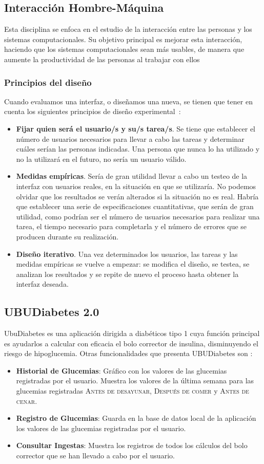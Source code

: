 \subsection{Interacción Hombre-Máquina}
Esta disciplina se enfoca en el estudio de la interacción entre las personas y los sistemas computacionales. Su objetivo principal es mejorar esta interacción, haciendo que los sistemas computacionales sean más usables, de manera que aumente la productividad de las personas al trabajar con ellos
\subsubsection{Principios del diseño}
Cuando evaluamos una interfaz, o diseñamos una nueva, se tienen que tener en cuenta los siguientes principios de diseño experimental~\cite{wiki:ipc}:
\begin{itemize}
	\item \textbf{Fijar quien será el usuario/s y su/s tarea/s}. Se tiene que establecer el número de usuarios necesarios para llevar a cabo las tareas y determinar cuáles serían las personas indicadas. Una persona que nunca lo ha utilizado y no la utilizará en el futuro, no sería un usuario válido.
	\item \textbf{Medidas empíricas}. Sería de gran utilidad llevar a cabo un testeo de la interfaz con usuarios reales, en la situación en que se utilizaría. No podemos olvidar que los resultados se verán alterados si la situación no es real. Habría que establecer una serie de especificaciones cuantitativas, que serán de gran utilidad, como podrían ser el número de usuarios necesarios para realizar una tarea, el tiempo necesario para completarla y el número de errores que se producen durante su realización.
	\item \textbf{Diseño iterativo}. Una vez determinados los usuarios, las tareas y las medidas empíricas se vuelve a empezar: se modifica el diseño, se testea, se analizan los resultados y se repite de nuevo el proceso hasta obtener la interfaz deseada. 
\end{itemize}
\subsection{UBUDiabetes 2.0}
UbuDiabetes es una aplicación dirigida a diabéticos tipo 1 cuya función principal es ayudarlos a calcular con eficacia el bolo corrector de insulina, disminuyendo el riesgo de hipoglucemia. 
Otras funcionalidades que presenta UBUDiabetes son : 
\begin{itemize}
	\item \textbf{Historial de Glucemias}: Gráfico con los valores de las glucemias registradas por el usuario. Muestra los valores de la última semana para las glucemias registradas \textsc{Antes de desayunar}, \textsc{Después de comer} y \textsc{Antes de cenar}.
	\item \textbf{Registro de Glucemias}: Guarda en la base de datos local de la aplicación los valores de las glucemias registradas por el usuario.
	\item \textbf{Consultar Ingestas}: Muestra los registros de todos los cálculos del bolo corrector que se han llevado a cabo por el usuario.
\end{itemize}


